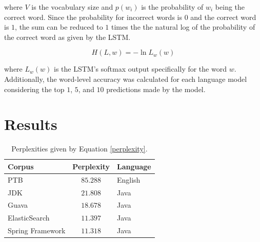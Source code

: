 \documentclass{article}
\begin{document}
where $V$ is the vocabulary size and $p(w_i)$ is the probability of
$w_i$ being the correct word. Since the probability for incorrect
words is $0$ and the correct word is $1$, the sum can be reduced to
$1$ times the the natural log of the probability of the correct word
as given by the LSTM.

\begin{equation}
    H(L,w) = - \ln L_w(w)
\end{equation}

where $L_w(w)$ is the LSTM's softmax output specifically for the
word $w$. Additionally, the word-level accuracy was calculated for
each language model considering the top $1$, $5$, and $10$ predictions
made by the model.




\section{Results}

\begin{table}[t]
    \caption{Perplexities given by Equation \ref{perplexity}.}
    \label{result-table}
    \vskip 0.15in
    \begin{center}
    \begin{tabular}{lcl}
    \hline
    \abovespace\belowspace
    Corpus & Perplexity & Language \\
    \hline
    \abovespace
    PTB                 & $85.288$ & English \\
    JDK                 & $21.808$ & Java \\
    Guava               & $18.678$ & Java \\
    ElasticSearch       & $11.397$ & Java \\
    \belowspace
    Spring Framework    & $11.318$ & Java \\
    \hline
    \end{tabular}
    \end{center}
    \vskip -0.1in
\end{table}
\end{document}
